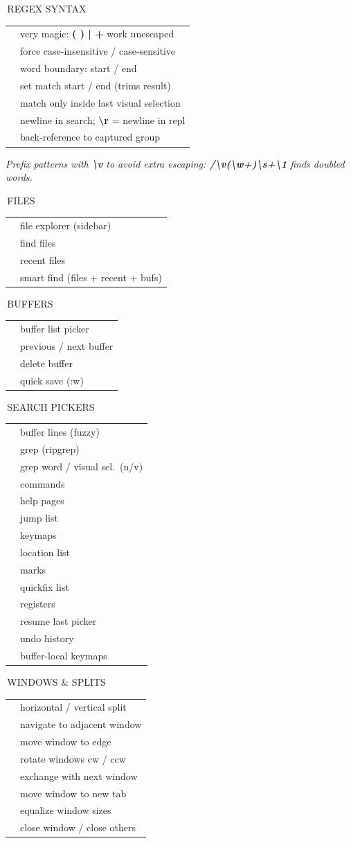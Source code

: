 \documentclass[9pt,a4paper,landscape]{extarticle}
\makeatletter
\newcommand{\kbd}[1]{{\ttfamily\bfseries\footnotesize\color{keyclr}#1}}
\newcommand{\sect}[1]{%
  \vspace{0.5pt}%
  {\setlength{\fboxsep}{1pt}%
   \noindent\colorbox{hdrbg}{\parbox{\dimexpr\columnwidth-2pt\relax}{%
     \color{hdrfg}\bfseries\sffamily\small\strut\,#1}}}%
  \par\vspace{0pt}}
\newlength{\kdsep}\setlength{\kdsep}{0pt}
\newcommand{\kd}[2]{\kbd{#1} & #2 \\[\kdsep]}
\newenvironment{kt}{%
  \setlength{\tabcolsep}{0pt}%
  \begin{tabular}{@{}>{\footnotesize\raggedright\arraybackslash}p{17mm}@{\hspace{2pt}}>{\footnotesize\color{bodyclr}\raggedright\arraybackslash}p{\dimexpr\columnwidth-17mm-2pt\relax}@{}}%
}{%
  \end{tabular}\par}
\newcommand{\snote}[1]{{\scriptsize\color{noteclr}\textit{#1}}\par}
\makeatother
\begin{document}
\begin{multicols}{5}
\sect{REGEX SYNTAX}
\begin{kt}
\kd{\textbackslash{}v}{very magic: \kbd{( ) | +} work unescaped}
\kd{\textbackslash{}c\,/\,\textbackslash{}C}{force case-insensitive / case-sensitive}
\kd{\textbackslash{}<\,/\,\textbackslash{}>}{word boundary: start / end}
\kd{\textbackslash{}zs\,/\,\textbackslash{}ze}{set match start / end (trims result)}
\kd{\textbackslash{}\%V}{match only inside last visual selection}
\kd{\textbackslash{}n}{newline in search; \kbd{\textbackslash{}r} = newline in repl}
\kd{\textbackslash{}1..\textbackslash{}9}{back-reference to captured group}
\end{kt}
\snote{Prefix patterns with \kbd{\textbackslash{}v} to avoid extra escaping: \kbd{/\textbackslash{}v(\textbackslash{}w+)\textbackslash{}s+\textbackslash{}1} finds doubled words.}

\sect{FILES}
\begin{kt}
\kd{SPC\,fe}{file explorer (sidebar)}
\kd{SPC\,ff}{find files}
\kd{SPC\,fr}{recent files}
\kd{SPC\,fs}{smart find (files + recent + bufs)}
\end{kt}

\sect{BUFFERS}
\begin{kt}
\kd{SPC\,bl}{buffer list picker}
\kd{SPC\,bp\,/\,bn}{previous / next buffer}
\kd{SPC\,bd}{delete buffer}
\kd{SPC\,w}{quick save (:w)}
\end{kt}

\sect{SEARCH PICKERS}
\begin{kt}
\kd{SPC\,sb}{buffer lines (fuzzy)}
\kd{SPC\,sg}{grep (ripgrep)}
\kd{SPC\,sw}{grep word / visual sel.\ (n/v)}
\kd{SPC\,sC}{commands}
\kd{SPC\,sh}{help pages}
\kd{SPC\,sj}{jump list}
\kd{SPC\,sk}{keymaps}
\kd{SPC\,sl}{location list}
\kd{SPC\,sm}{marks}
\kd{SPC\,sq}{quickfix list}
\kd{SPC\,sr}{registers}
\kd{SPC\,sR}{resume last picker}
\kd{SPC\,su}{undo history}
\kd{SPC\,?}{buffer-local keymaps}
\end{kt}

\sect{WINDOWS \& SPLITS}
\begin{kt}
\kd{C-w\,s\,/\,v}{horizontal / vertical split}
\kd{C-w\,h/j/k/l}{navigate to adjacent window}
\kd{C-w\,H/J/K/L}{move window to edge}
\kd{C-w\,r\,/\,R}{rotate windows cw / ccw}
\kd{C-w\,x}{exchange with next window}
\kd{C-w\,T}{move window to new tab}
\kd{C-w\,=}{equalize window sizes}
\kd{C-w\,q\,/\,C-w\,o}{close window / close others}
\end{kt}


\end{multicols}
\end{document}
